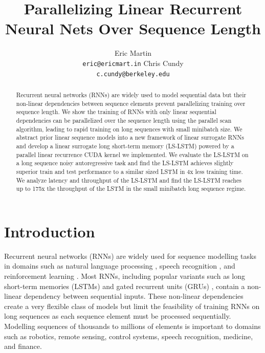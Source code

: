 \documentclass{article}
\title{Parallelizing Linear Recurrent Neural Nets Over Sequence Length}
\author{
  Eric Martin \\%
  \texttt{eric@ericmart.in}
  \And
  Chris Cundy \\
  \texttt{c.cundy@berkeley.edu}
}
\begin{document}

\maketitle

\begin{abstract}
Recurrent neural networks (RNNs) are widely used to model sequential data 
but their non-linear dependencies between sequence elements prevent parallelizing
training over sequence length. We show the training of RNNs with only 
linear sequential dependencies can be parallelized over the
sequence length using the parallel scan algorithm, leading to rapid training
on long sequences with small minibatch size. We abstract prior linear sequence models
into a new framework of linear surrogate RNNs and develop
a linear surrogate long short-term memory (LS-LSTM) powered by a parallel linear recurrence
CUDA kernel we implemented.
We evaluate the LS-LSTM on a long sequence noisy autoregressive task and find
the LS-LSTM achieves slightly superior train and test performance to a similar 
sized LSTM in 4x less training time. We analyze latency and throughput of
the LS-LSTM and find the LS-LSTM reaches up to 
175x the throughput of the LSTM in the small minibatch long sequence regime.
\end{abstract}

\section{Introduction}

Recurrent neural networks (RNNs) are widely used for sequence modelling tasks in domains such as 
natural language processing \cite{sutskever2014sequence}, 
speech recognition \cite{amodei2015deep},
and reinforcement learning \cite{hausknecht2015deep}. Most RNNs, including popular variants such as long short-term memories (LSTMs) \cite{hochreiter1997long} and gated recurrent units (GRUs) \cite{cho2014learning}, contain a non-linear dependency
between sequential inputs. These non-linear dependencies create a very flexible class of
models but limit the feasibility of training RNNs on long sequences as each sequence element
must be processed sequentially.
Modelling sequences of thousands to millions of elements is important to domains
such as robotics, remote sensing, control systems, speech recognition, medicine, and finance.
\end{document}
